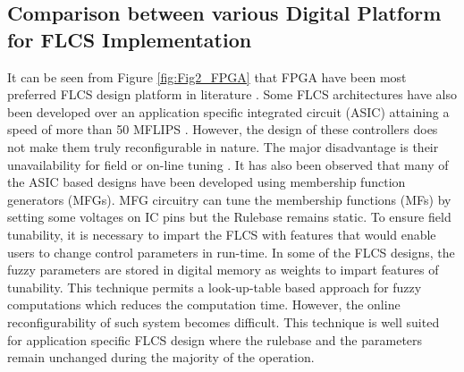 \subsection{Comparison between various Digital Platform for FLCS Implementation}
It can be seen from Figure \ref{fig:Fig2_FPGA} that FPGA have been most preferred FLCS design platform in literature  \cite{Brox2013,Adhavan2014a,Maji2014a,Messai2011,Tamukoh2007,Schrieber2015,Palakeerthi2014,Santos2014,Benzekri20146109,Islam2013}. Some FLCS architectures have also been developed over an application specific integrated circuit (ASIC) \cite{RoyChowdhury2011,Martinez-Rodriguez2015,Brox2013,Murshid2011,DaijinKim2000} attaining a speed of more than 50 MFLIPS \cite{Bosque2014b,Zavala2012,Murshid2011}. However, the design of these controllers does not make them truly reconfigurable in nature. The major disadvantage is their unavailability for field or on\hyp{}line tuning \cite{Bosque2014b,Passino2010}. It has also been observed that many of the ASIC based designs have been developed using membership function generators (MFGs). MFG circuitry can tune the membership functions (MFs) by setting some voltages on IC pins \cite{Soleimani2014,Mokarram2015} but the Rulebase remains static. To ensure field tunability, it is necessary to impart the FLCS with features that would enable users to change control parameters in run\hyp{}time. In some of the FLCS designs, the fuzzy parameters are stored in digital memory as weights \cite{Bosque2014b,Zavala2012,Kalaykov1999} to impart features of tunability. This technique permits a look-up-table based approach for fuzzy computations which reduces the computation time. However, the online reconfigurability of such system becomes difficult. This technique is well suited for application specific FLCS design where the rulebase and the parameters remain unchanged during the majority of the operation.

